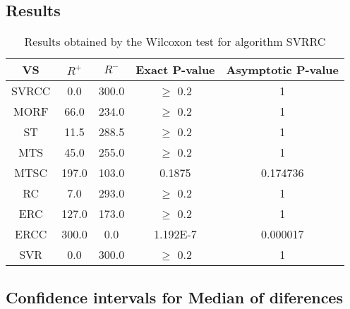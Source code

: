\documentclass[a4paper,10pt]{article}
\begin{document}
\subsection{Results}

\begin{table}[!htp]
\centering\small
\begin{tabular}{
|c|c|c|c|c|}
\hline
 VS & $R^{+}$ & $R^{-}$ & Exact P-value & Asymptotic P-value \\ \hline 
SVRCC & 0.0 & 300.0 & $\geq$ 0.2 & 1\\ \hline 
MORF & 66.0 & 234.0 & $\geq$ 0.2 & 1\\ \hline 
ST & 11.5 & 288.5 & $\geq$ 0.2 & 1\\ \hline 
MTS & 45.0 & 255.0 & $\geq$ 0.2 & 1\\ \hline 
MTSC & 197.0 & 103.0 & 0.1875 & 0.174736\\ \hline 
RC & 7.0 & 293.0 & $\geq$ 0.2 & 1\\ \hline 
ERC & 127.0 & 173.0 & $\geq$ 0.2 & 1\\ \hline 
ERCC & 300.0 & 0.0 & 1.192E-7 & 0.000017\\ \hline 
SVR & 0.0 & 300.0 & $\geq$ 0.2 & 1\\ \hline 

\end{tabular}
\caption{Results obtained by the Wilcoxon test for algorithm SVRRC}
\end{table}

\subsection{Confidence intervals for Median of diferences}
\end{document}
